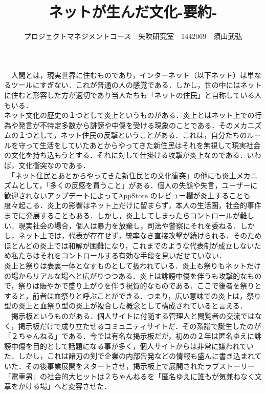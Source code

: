 \documentclass[uplatex,twocolumn,dvipdfmx]{jsarticle}
\title{\vspace{-5mm}\fontsize{14pt}{0pt}\selectfont ネットが生んだ文化-要約-}
\author{\normalsize プロジェクトマネジメントコース　矢吹研究室　1442069　須山武弘}
\date{}
\begin{document}
\fontsize{10.5pt}{\baselineskip}\selectfont
\maketitle


　人間とは，現実世界に住むものであり，インターネット（以下ネット）は単なるツールにすぎない．これが普通の人の感覚である．しかし，世の中にはネットに住むと形容した方が適切であり当人たちも「ネットの住民」と自称している人もいる．\\
ネット文化の歴史の１つとして炎上というものがある．炎上とはネット上での行為や発言が不特定多数から誹謗や中傷を受ける現象のことである．そのメカニズムの１つとして，ネット住民の反撃ということがある．これは，自分たちのルールを守って生活をしていたあとからやってきた新住民はそれを無視して現実社会の文化を持ち込もうとする．それに対して仕掛ける攻撃が炎上なのである．いわば，文化衝突なのである．\\
　「ネット住民とあとからやってきた新住民との文化衝突」の他にも炎上メカニズムとして，「多くの反感を買うこと」がある．個人の失態や失言，ユーザーに歓迎されないアップデートによってAppStore のレビュー欄が炎上することも度々起こる．炎上の影響はネット上だけに留まらず，本人の生活圏，社会的事件までに発展することもある．しかし，炎上してしまったらコントロールが難しい．現実社会の場合，個人は暴力を放棄し，司法や警察にそれを委ねる．しかし，ネット上では，代表が存在せず，統率なき直接攻撃が続けられる．そのためほとんどの炎上では和解が困難になり，これまでのような代表制が成立しないため私たちはそれをコントロールする有効な手段を見いだせていない．\\
炎上と祭りは表裏一体となすものとして扱われている．炎上も祭りもネットだけの場からリアルな場へと広がりつつある．炎上は誹謗中傷を伴うも攻撃的なもので，祭りは賑やかで盛り上がりを伴う祝賀的なものである．ここで後者を祭りとすると，前者は血祭りと呼ぶことができる．つまり，広い意味での炎上は，祭り型の炎上と血祭り型の炎上が複合した概念として構成されていると言える．\\
　掲示板というものがある．個人サイトに付随する管理人と閲覧者の交流ではなく，掲示板だけで成り立たせるコミュニティサイトだ．その系譜で誕生したのが「２ちゃんねる」である．今では有名な掲示板だが，初めの２年は匿名ゆえに誹謗中傷を目的として話題になる事が多く，個人サイトからは非常に嫌われていた．しかし，これは諸刃の剣で企業の内部告発などの情報も盛んに書き込まれていた．その後事業展開をスタートさせ，掲示板上で展開されたラブストーリー「電車男」の社会的大ヒットは２ちゃんねるを「匿名ゆえに誰もが気兼ねなく文章をかける場」へと変容させた．\\
\end{document}
